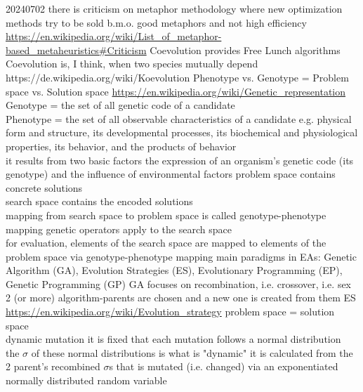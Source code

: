 \documentclass{article}\usepackage[margin=2cm]{geometry}
\begin{document}
\begin{cascade}
    20240702
    \stepin
    there is criticism on metaphor methodology where new optimization methods try to be sold b.m.o. good metaphors and not high efficiency
    \stepin
    \url{https://en.wikipedia.org/wiki/List_of_metaphor-based_metaheuristics#Criticism}
    \stepout
    Coevolution provides Free Lunch algorithms
    \stepin
    Coevolution is, I think, when two species mutually depend\\
    https://de.wikipedia.org/wiki/Koevolution
    \stepout
    Phenotype vs. Genotype = Problem space vs. Solution space \url{https://en.wikipedia.org/wiki/Genetic_representation}
    \stepin
    Genotype = the set of all genetic code of a candidate\\
    Phenotype = the set of all observable characteristics of a candidate
    \stepin
    e.g. physical form and structure, its developmental processes, its biochemical and physiological properties, its behavior, and the products of behavior\\
    it results from two basic factors
    \stepin
    the expression of an organism's genetic code (its genotype) and the influence of environmental factors
    \stepout
    \stepout
    problem space contains concrete solutions\\
    search space contains the encoded solutions\\
    mapping from search space to problem space is called genotype-phenotype mapping
    \stepin
    genetic operators apply to the search space\\
    for evaluation, elements of the search space are mapped to elements of the problem space via genotype-phenotype mapping
    \stepout
     main paradigms in EAs: Genetic Algorithm (GA), Evolution Strategies (ES), Evolutionary Programming (EP), Genetic Programming (GP)
    GA
    \stepin
    focuses on recombination, i.e. crossover, i.e. sex\\
    2 (or more) algorithm-parents are chosen and a new one is created from them
    \stepout
    ES \url{https://en.wikipedia.org/wiki/Evolution_strategy}
    \stepin
    problem space = solution space\\
    dynamic mutation
    \stepin
    it is fixed that each mutation follows a normal distribution\\
    the $\sigma$ of these normal distributions is what is "dynamic"
    \stepin
    it is calculated from the 2 parent's recombined $\sigma$s that is mutated (i.e. changed) via an exponentiated normally distributed random variable

\end{cascade}
\end{document}
